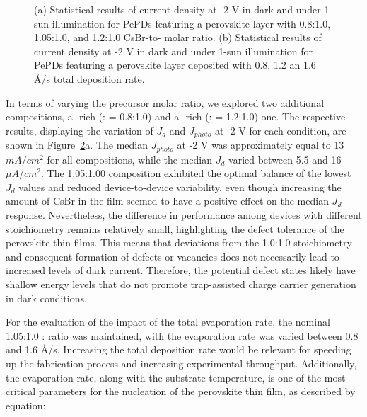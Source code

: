 \begin{figure}[htbp]
\begin{subfigure}[t]{0.45\textwidth}
        \caption{}
        \label{fig:etl:opt:evap_rate}
    \end{subfigure}    
    \caption[Impact of CsBr to  molar ratio and total evaporation rate during the perovskite deposition on current density of the PePDs with 40 nm of  as the ETL.]{(a) Statistical results of current density at -2 V in dark and under 1-sun illumination for PePDs featuring a perovskite layer with 0.8:1.0, 1.05:1.0, and 1.2:1.0 CsBr-to- molar ratio. (b) Statistical results of current density at -2 V in dark and under 1-sun illumination for PePDs featuring a perovskite layer deposited with 0.8, 1.2 an 1.6 \AA/s total deposition rate. }
    \label{fig:etl_opt:molar_and_rate}
\end{figure}

In terms of varying the precursor molar ratio, we explored two additional compositions, a -rich (: = 0.8:1.0) and a -rich (: = 1.2:1.0) one. The respective results, displaying the variation of $J_d$ and $J_{photo}$ at -2 V for each condition, are shown in Figure~\ref{fig:etl_opt:molar_and_rate}a. The median $J_{photo}$ at -2 V was approximately equal to 13 $mA/cm^2$ for all compositions, while the median $J_d$ varied between 5.5 and 16 $\mu A/cm^2$. The 1.05:1.00 composition exhibited the optimal balance of the lowest $J_d$ values and reduced device-to-device variability, even though increasing the amount of CsBr in the film seemed to have a positive effect on the median $J_d$ response. Nevertheless, the difference in performance among devices with different stoichiometry remains relatively small, highlighting the defect tolerance of the perovskite thin films. This means that deviations from the 1.0:1.0 stoichiometry and consequent formation of defects or vacancies does not necessarily lead to increased levels of dark current. Therefore, the potential defect states likely have shallow energy levels that do not promote trap-assisted charge carrier generation in dark conditions.


For the evaluation of the impact of the total evaporation rate, the nominal 1.05:1.0 : ratio was maintained, with the evaporation rate was varied between 0.8 and 1.6 \AA/s. Increasing the total deposition rate would be relevant for speeding up the fabrication process and increasing experimental throughput. Additionally, the evaporation rate, along with the substrate temperature, is one of the most critical parameters for the nucleation of the perovskite thin film, as described by equation: 

